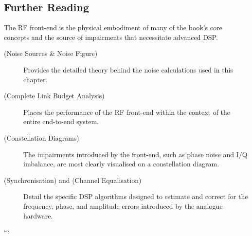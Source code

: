 \begin{importantbox}
\section*{Further Reading}
The RF front-end is the physical embodiment of many of the book's core concepts and the source of impairments that necessitate advanced DSP.
\begin{description}
    \item[ (Noise Sources \& Noise Figure)] Provides the detailed theory behind the noise calculations used in this chapter.
    \item[ (Complete Link Budget Analysis)] Places the performance of the RF front-end within the context of the entire end-to-end system.
    \item[ (Constellation Diagrams)] The impairments introduced by the front-end, such as phase noise and I/Q imbalance, are most clearly visualised on a constellation diagram.
    \item[ (Synchronisation) and  (Channel Equalisation)] Detail the specific DSP algorithms designed to estimate and correct for the frequency, phase, and amplitude errors introduced by the analogue hardware.
\end{description}
\end{importantbox}
```

